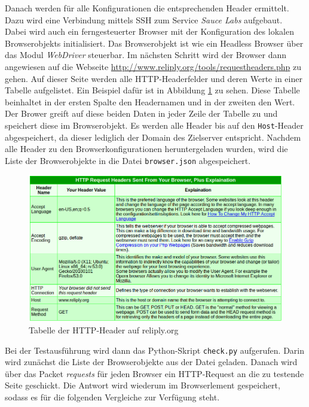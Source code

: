 Danach werden für alle Konfigurationen die entsprechenden Header ermittelt.
Dazu wird eine Verbindung mittels \ac{SSH} zum Service \textit{Sauce Labs} aufgebaut.
Dabei wird auch ein ferngesteuerter Browser mit der Konfiguration des lokalen Browserobjekts initialisiert.
Das Browserobjekt ist wie ein Headless Browser über das Modul \textit{WebDriver} steuerbar.
Im nächsten Schritt wird der Browser dann angewiesen auf die Webseite \url{http://www.reliply.org/tools/requestheaders.php} zu gehen.
Auf dieser Seite werden alle \acs{HTTP}-Headerfelder und deren Werte in einer Tabelle aufgelistet.
Ein Beispiel dafür ist in Abbildung \ref{fig:reliply} zu sehen.
Diese Tabelle beinhaltet in der ersten Spalte den Headernamen und in der zweiten den Wert.
Der Brower greift auf diese beiden Daten in jeder Zeile der Tabelle zu und speichert diese im Browserobjekt.
Es werden alle Header bis auf den \lstinline[style=eclipse]{Host}-Header abgespeichert, da dieser lediglich der
Domain des Zielserver entspricht.
Nachdem alle Header zu den Browserkonfigurationen heruntergeladen wurden, wird die Liste der
Browserobjekte in die Datei \lstinline[style=eclipse]{browser.json} abgespeichert.

\begin{figure}[H]
	\centering
	\includegraphics[width=\textwidth]{images/reliply.png}
	\caption{Tabelle der HTTP-Header auf reliply.org}
	\label{fig:reliply}
\end{figure}

Bei der Testausführung wird dann das Python-Skript \lstinline[style=eclipse]{check.py} aufgerufen.
Darin wird zunächst die Liste der Browserobjekte aus der Datei geladen.
Danach wird über das Packet \textit{requests} für jeden Browser ein \acs{HTTP}-Request an die zu
testende Seite geschickt.
Die Antwort wird wiederum im Browserlement gespeichert, sodass es für die folgenden Vergleiche zur
Verfügung steht.

